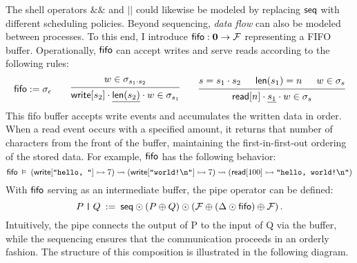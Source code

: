 The shell operators $\texttt{\&\&}$ and $\texttt{||}$ could likewise be modeled
by replacing $ \mathsf{seq} $ with different scheduling policies.
Beyond sequencing,
\emph{data flow} can also be modeled
between processes.
To this end,
I introduce
$ \mathsf{fifo}  : \mathbf{0} \rightarrow \mathcal{F}$
representing a FIFO buffer.
Operationally,
$ \mathsf{fifo} $ can accept writes
and serve reads
according to the following rules:
\[
  \kw{fifo} := \sigma_\epsilon
  \qquad
  \begin{prooftree}
    \hypo{w \in \sigma_{s_1 \cdot s_2}}
    \infer1{\kw{write}[s_2] \cdot \underline{\kw{len}(s_2)} \cdot w \in \sigma_{s_1}}
  \end{prooftree}
  \qquad
  \begin{prooftree}
    \hypo{s = s_1 \cdot s_2}
    \hypo{\kw{len}(s_1) = n}
    \hypo{w \in \sigma_s}
    \infer3{\kw{read}[n] \cdot \underline{s_1} \cdot w \in \sigma_s}
  \end{prooftree}
\]
This fifo buffer accepts write events
and accumulates the written data in order.
When a read event occurs with a specified amount,
it returns that number of characters
from the front of the buffer,
maintaining the first-in-first-out ordering
of the stored data.
For example, $ \mathsf{fifo} $ has the following behavior:
{\small
  \[
     \mathsf{fifo}  \: \vDash \:
    ( \mathsf{write} [\texttt{"hello, "}] \rightarrowtail 7) \leadsto
    ( \mathsf{write} [\texttt{"world!\textbackslash{}n"}] \rightarrowtail 7) \leadsto
    ( \mathsf{read} [100] \rightarrowtail \texttt{"hello, world!\textbackslash{}n"})
  \]
}%
With $ \mathsf{fifo} $ serving as an intermediate buffer,
the pipe operator can be defined:
\[
  P \mathbin\texttt{|} Q \: := \:
   \mathsf{seq}  \odot (P \oplus Q)
  \odot (\mathcal{F} \oplus (\Delta \odot  \mathsf{fifo} ) \oplus \mathcal{F})
  \,.
\]
Intuitively, the pipe connects
the output of P to the input of Q via the buffer,
while the sequencing ensures that
the communication proceeds in an orderly fashion.
The structure of this composition is illustrated
in the following diagram.
